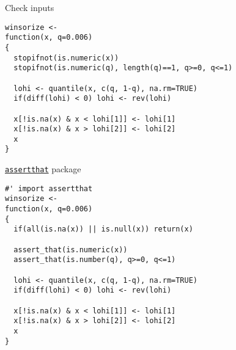 \documentclass[12pt,t]{beamer}
\begin{document}
\begin{frame}[c,fragile]{Check inputs}


\begin{lstlisting}
winsorize <-
function(x, q=0.006)
{
  stopifnot(is.numeric(x))
  stopifnot(is.numeric(q), length(q)==1, q>=0, q<=1)

  lohi <- quantile(x, c(q, 1-q), na.rm=TRUE)
  if(diff(lohi) < 0) lohi <- rev(lohi)

  x[!is.na(x) & x < lohi[1]] <- lohi[1]
  x[!is.na(x) & x > lohi[2]] <- lohi[2]
  x
}
\end{lstlisting}


\end{frame}




\begin{frame}[c,fragile]{\href{http://github.com/hadley/assertthat}{\tt assertthat} package}


\begin{lstlisting}
#' import assertthat
winsorize <-
function(x, q=0.006)
{
  if(all(is.na(x)) || is.null(x)) return(x)

  assert_that(is.numeric(x))
  assert_that(is.number(q), q>=0, q<=1)

  lohi <- quantile(x, c(q, 1-q), na.rm=TRUE)
  if(diff(lohi) < 0) lohi <- rev(lohi)

  x[!is.na(x) & x < lohi[1]] <- lohi[1]
  x[!is.na(x) & x > lohi[2]] <- lohi[2]
  x
}
\end{lstlisting}


\end{frame}
\end{document}
